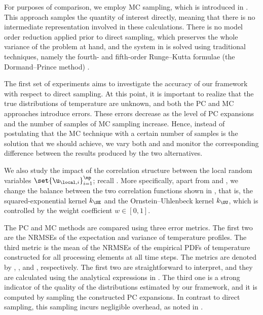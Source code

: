 For purposes of comparison, we employ \ac{MC} sampling, which is introduced in
. This approach samples the quantity of interest directly, meaning
that there is no intermediate representation involved in these calculations.
There is no model order reduction applied prior to direct sampling, which
preserves the whole variance of the problem at hand, and the system in
 is solved using traditional techniques, namely
the fourth- and fifth-order Runge--Kutta formulae (the Dormand--Prince method)
\cite{press2007}.


The first set of experiments aims to investigate the accuracy of our framework
with respect to direct sampling. At this point, it is important to realize that
the true distributions of temperature are unknown, and both the \ac{PC} and
\ac{MC} approaches introduce errors. These errors decrease as the level \lc of
\ac{PC} expansions and the number of samples \no of \ac{MC} sampling increase.
Hence, instead of postulating that the \ac{MC} technique with a certain number
of samples is the solution that we should achieve, we vary both \lc and \no and
monitor the corresponding difference between the results produced by the two
alternatives.

We also study the impact of the correlation structure between the local random
variables $\set{\u_{\local, i}}_{i = 1}^\np$; recall
. More specifically, apart from \lc and \no,
we change the balance between the two correlation functions shown in
, that is, the squared-exponential kernel $k_\SE$ and
the Ornstein--Uhlenbeck kernel $k_\OU$, which is controlled by the weight
coefficient $w \in [0, 1]$.

The \ac{PC} and \ac{MC} methods are compared using three error metrics. The
first two are the \acp{NRMSE} of the expectation and variance of temperature
profiles. The third metric is the mean of the \acp{NRMSE} of the empirical
\acp{PDF} of temperature constructed for all processing elements at all time
steps. The metrics are denoted by \error{\expectation}, \error{\variance}, and
, respectively. The first two are straightforward to interpret, and
they are calculated using the analytical expressions in .
The third one is a strong indicator of the quality of the distributions
estimated by our framework, and it is computed by sampling the constructed
\ac{PC} expansions. In contrast to direct sampling, this sampling incurs
negligible overhead, as noted in .

